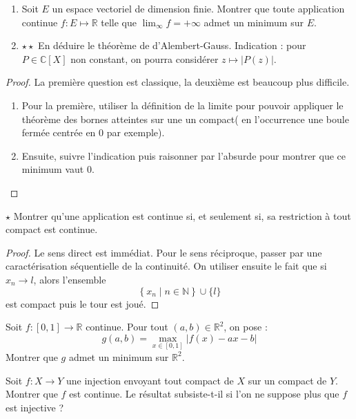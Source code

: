 \documentclass[french,a4paper]{article}
\newcommand{\N}{\mathbb{N}}
\newcommand{\R}{\mathbb{R}}
\newcommand{\C}{\mathbb{C}}
\theoremstyle{plain}
\theoremstyle{definition}
\theoremstyle{remark}
\begin{document}
\begin{ex}[Moulin.18]{}
	\begin{enumerate}
		\item Soit $E$ un espace vectoriel de dimension finie. Montrer que toute application continue $f:E\mapsto\R$ telle que $\displaystyle\lim_{\infty}f=+\infty$ admet un minimum sur $E$.
		\item $\star\star$ En déduire le théorème de d'Alembert-Gauss. Indication : pour $P\in\C[X]$ non constant, on pourra considérer $z\mapsto\lvert P(z)\rvert$.
	\end{enumerate}
\end{ex}
\begin{proof}
	La première question est classique, la deuxième est beaucoup plus difficile.
	\begin{enumerate}
		\item Pour la première, utiliser la définition de la limite pour pouvoir appliquer le théorème des bornes atteintes sur une un compact( en l'occurrence une boule fermée centrée en $0$ par exemple).
		\item Ensuite, suivre l'indication puis raisonner par l'absurde pour montrer que ce minimum vaut $0$.
	\end{enumerate}
\end{proof}

\begin{ex}[Moulin.19]{$\star$}
	Montrer qu'une application est continue si, et seulement si, sa restriction à tout compact est continue.
\end{ex}
\begin{proof}
	Le sens direct est immédiat. Pour le sens réciproque, passer par une caractérisation séquentielle de la continuité. On utiliser ensuite le fait que si $x_n\to l$, alors l'ensemble $$\left\{x_n\mid n\in\N\right\}\cup\{l\}$$ est compact puis le tour est joué.
\end{proof}

\begin{ex}[Moulin.20]{}
	Soit $f:[0,1]\to\R$ continue. Pour tout $(a,b)\in\R^2$, on pose : $$g(a,b)=\underset{x\in[0,1]}{\max}\lvert f(x)-ax-b\rvert$$ Montrer que $g$ admet un minimum sur $\R^2$.
\end{ex}

\begin{ex}[Moulin.21]{}
	Soit $f:X\to Y$ une injection envoyant tout compact de $X$ sur un compact de $Y$. Montrer que $f$ est continue. Le résultat subsiste-t-il si l'on ne suppose plus que $f$ est injective ?
\end{ex}
\end{document}

